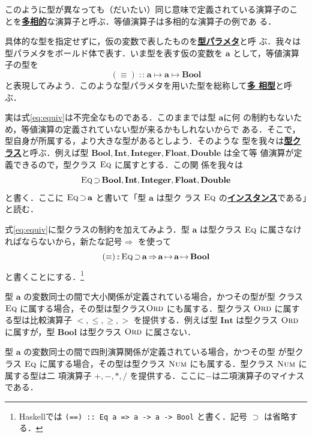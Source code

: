 \documentclass[a5paper,twoside,fleqn,draft]{jsbook}
\newcommand{\programminglanguage}[1]{\textsf{#1}}
\newcommand{\haskell}{\programminglanguage{Haskell}}
\newcommand{\keyword}[1]{{\underline{\textbf{#1}}}}
\newcommand{\code}[1]{\texttt{#1}}
\DeclareMathOperator{\mSuperClass}{\Rightarrow}
\DeclareMathOperator{\mSuperSet}{\supset}
\DeclareMathOperator{\mIn}{{:\!:}}
\DeclareMathOperator{\mMapsTo}{\mapsto}
\newcommand{\mType}[1]{\mathbf{#1}} %
\newcommand{\mA}{\mType{a}}
\newcommand{\mBoolType}{\mType{Bool}}
\newcommand{\mFloatType}{\mType{Float}}
\newcommand{\mDoubleType}{\mType{Double}}
\newcommand{\mIntType}{\mType{Int}}
\newcommand{\mIntegerType}{\mType{Integer}}
\newcommand{\mTypeClass}[1]{\textsc{#1}} %
\newcommand{\mEqTypeClass}{\mTypeClass{Eq}}
\newcommand{\mNumTypeClass}{\mTypeClass{Num}}
\newcommand{\mOrdTypeClass}{\mTypeClass{Ord}}
\begin{document}
このように型が異なっても（だいたい）同じ意味で定義されている演算子のこ
とを\keyword{多相的}な演算子と呼ぶ．等値演算子は多相的な演算子の例であ
る．

具体的な型を指定せずに，仮の変数で表したものを\keyword{型パラメタ}と呼
ぶ．我々は型パラメタをボールド体で表す．いま型を表す仮の変数を
$\mA $ として，等値演算子の型を
\begin{equation}
  \label{eq:equiv}
  (\equiv)
  \mIn\mA\mMapsTo\mA\mMapsTo\mBoolType
\end{equation}
と表現してみよう．このような型パラメタを用いた型を総称して\keyword{多
  相型}と呼ぶ．

実は式\eqref{eq:equiv}は不完全なものである．このままでは型 $\mA $に何
の制約もないため，等値演算の定義されていない型が来るかもしれないからで
ある．そこで，型自身が所属する，より大きな型があるとしよう．そのような
型を我々は\keyword{型クラス}と呼ぶ．例えば型
$\mBoolType,\mIntType,\mIntegerType,\mFloatType,\mDoubleType$ は全て等
値演算が定義できるので，型クラス $\mEqTypeClass$ に属すとする．この関
係を我々は
\begin{equation}
  \mEqTypeClass
  \mSuperSet\mBoolType,\mIntType,\mIntegerType,\mFloatType,\mDoubleType
\end{equation}
と書く．ここに $\mEqTypeClass\mSuperSet\mA$ と書いて「型 $\mA$ は型ク
  ラス $\mEqTypeClass$ の\keyword{インスタンス}である」と読む．

式\eqref{eq:equiv}に型クラスの制約を加えてみよう．型 $\mA$ は型クラス
$\mEqTypeClass$ に属さなければならないから，新たな記号$\mSuperClass$
を使って
\begin{equation}
  (\equiv)
  \mIn{}\mEqTypeClass\mSuperSet\mA
  \mSuperClass\mA\mMapsTo\mA\mMapsTo\mBoolType
\end{equation}
と書くことにする．\footnote{\haskell では \code{(==) :: Eq a => a -> a
    -> Bool} と書く．記号 $\mSuperSet$ は省略する．}

型 $\mA$ の変数同士の間で大小関係が定義されている場合，かつその型が型
クラス $\mEqTypeClass$ に属する場合，その型は型クラス$\mOrdTypeClass$
にも属する．型クラス $\mOrdTypeClass$ に属する型は比較演算子
$<,\le,\ge,>$ を提供する．例えば型 $\mIntType$ は型クラス
$\mOrdTypeClass$ に属すが，型 $\mBoolType$ は型クラス $\mOrdTypeClass$
に属さない．

型 $\mA$ の変数同士の間で四則演算関係が定義されている場合，かつその型
が型クラス $\mEqTypeClass$ に属する場合，その型は型クラス
$\mNumTypeClass$ にも属する．型クラス $\mNumTypeClass$ に属する型は二
項演算子 $+,-,*,/$ を提供する．ここに$-$は二項演算子のマイナスである．
\end{document}

